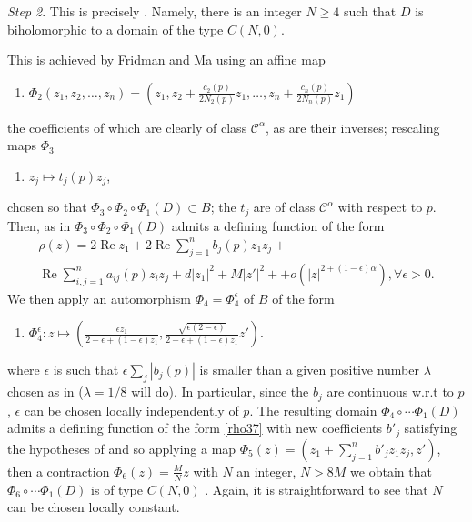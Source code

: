 \documentclass[a4paper,12pt]{amsart}
\def\re{\operatorname{Re}}
\theoremstyle{remark}\newtheorem{remark}[theorem]{Remark}
\begin{document}
\medskip

{\it Step 2}. This is precisely \cite[Lemma 3.2]{FM}. Namely, there is an integer $N\geq 4$ such that $D$ is biholomorphic to a domain of the type $C(N,0)$.

This is achieved by Fridman and Ma using an affine map  
\begin{enumerate} 
\item[$iii)$] $\Phi_2(z_1, z_2, \dots, z_n)=
\left( z_1, z_2+\frac{c_2(p)}{2N_2(p)} z_1, \dots, 
z_n+\frac{c_n(p)}{2N_n(p)} z_1\right)$ 
\end{enumerate}
the coefficients of
which are clearly of class $\mathcal C^\alpha$, as are their inverses; rescaling maps $\Phi_3$
\begin{enumerate} 
\item[$iv)$] $z_j\mapsto t_j(p) z_j$,
\end{enumerate}
chosen so that $\Phi_3 \circ \Phi_2 \circ \Phi_1 (D)\subset B$;
 the $t_j$ are of class $\mathcal C^\alpha$ with respect to $p$. Then, as in \cite[(3.7), p. 391]{FM} $\Phi_3 \circ \Phi_2 \circ \Phi_1 (D)$ admits a defining function of the form
\begin{multline}
\label{rho37}
  \rho(z) = 2\re z_1 + 2  \re \sum_{j=1}^n b_{j}(p)z_1 z_j 
+\\ 
\re \sum_{i,j=1}^n a_{ij}(p)z_i z_j + d|z_1|^2
+M |z'|^2+  + o(|z|^{2+(1-\epsilon)\alpha}),
\forall \epsilon >0.  
\end{multline}
We then apply an automorphism $\Phi_4=\Phi_4^\epsilon$ of $B$ of the form
\begin{enumerate}
\item[$v)$] $\Phi_4^\epsilon: z\mapsto \left( \frac{\epsilon z_1}{ 2- \epsilon + (1-\epsilon) z_1}, \frac{\sqrt{\epsilon (2-\epsilon)}}{2- \epsilon + (1-\epsilon) z_1} z'\right).$
\end{enumerate}
where $\epsilon$ is such that $\epsilon \sum_j |b_j(p)|$ is smaller than a given positive  number $\lambda$ chosen as in 
\cite[Lemma 3.1, p. 390]{FM}
($\lambda=1/8$ will do). In particular, since 
the $b_j$ are continuous w.r.t to $p$, $\epsilon$ can be chosen locally independently of $p$. The resulting domain
$\Phi_4 \circ \cdots \Phi_1(D)$ admits a defining function of the 
form \eqref{rho37} with new coefficients $b'_j$ satisfying the
hypotheses of \cite[Lemma 3.1]{FM} and so applying a map
$\Phi_5(z)=(z_1+\sum_{j=1}^n b'_j z_1 z_j,z')$, then
a contraction $\Phi_6(z)= \frac{M}N z$ with $N$ an integer,
$N>8M$ we obtain that $\Phi_6 \circ \cdots \Phi_1(D)$
is of type $C(N,0)$ \cite[end of proof of Lemma 3.2, p. 392]{FM}.
Again, it is straightforward to see that $N$ can be chosen locally constant.
\end{document}
